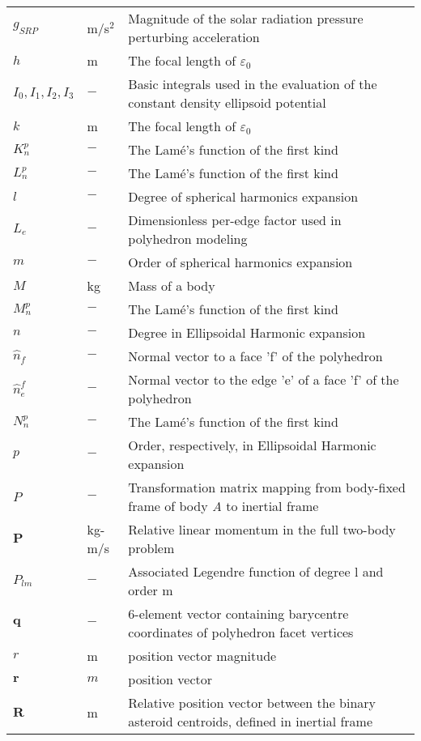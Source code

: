 \begin{longtable}[l]{p{100pt} p{70pt} p{250pt}}
$g_{SRP}$		& m$/$s$^2$	& Magnitude of the solar radiation pressure perturbing acceleration\\
$h$		& m		& The  focal length of $\varepsilon_0$\\
$I_0, I_1, I_2, I_3$	& $-$		& Basic integrals used in the evaluation of the constant density ellipsoid potential\\
$k$		& m		& The focal length of $\varepsilon_0$\\
$K_n^p$	& $-$		& The  Lam\' e's function of the first kind\\
$L_n^p$	& $-$		& The Lam\' e's function of the first kind\\
$l$		& $-$		& Degree of spherical harmonics expansion\\
$L_e$	& $-$		& Dimensionless per-edge factor used in polyhedron modeling\\
$m$		& $-$		& Order of spherical harmonics expansion\\
$M$		& kg		& Mass of a body\\
$M_n^p$	& $-$		& The  Lam\' e's function of the first kind\\
$n$		& $-$		& Degree in Ellipsoidal Harmonic expansion\\
$\hat{n}_f$		& $-$		& Normal vector to a face 'f' of the polyhedron\\
$\hat{n}_e^f$		& $-$	& Normal vector to the edge 'e' of a face 'f' of the polyhedron\\
$N_n^p$	& $-$		& The Lam\' e's function of the first kind\\
$p$		& $-$		& Order, respectively, in Ellipsoidal Harmonic expansion\\
$P$	& $-$	& Transformation matrix mapping from body-fixed frame of body \textit{A} to inertial frame\\
$\mathbf{P}$	& kg-m$/$s	& Relative linear momentum in the full two-body problem\\
$P_{lm}$	& $-$	& Associated Legendre function of degree l and order m\\
$\mathbf{q}$		& $-$		& 6-element vector containing barycentre coordinates of polyhedron facet vertices\\
$r$				& m		& position vector magnitude\\
$\mathbf{r}$	& $m$		& position vector\\
$\mathbf{R}$ 	& m		& Relative position vector between the binary asteroid centroids, defined in inertial frame\\

\end{longtable}
